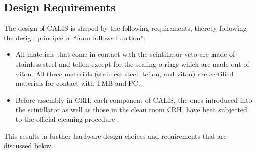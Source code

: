 \subsection{Design Requirements}
The design of CALIS is shaped by the following requirements, thereby following the design principle of ``form follows function'': 
\begin{itemize}


Also protection and safety mechanisms that avoid exposure of personal to scintillators are in place.
neutron gun inside a dedicated deployment device currently under development (Section \ref{sec:Outlook}).
\item All materials that come in contact with the scintillator veto are made of stainless steel and teflon except for the sealing o-rings which are made out of viton.  All three materials (stainless steel, teflon, and viton) are certified materials for contact with TMB and PC.
\item Before assembly in CRH, each component of CALIS, the ones introduced into the scintillator as well as those in the clean room CRH, have been subjected to the official cleaning procedure \cite{DS50:cleaning}. 
\end{itemize}

This results in further hardware design choices and requirements that are discussed below.